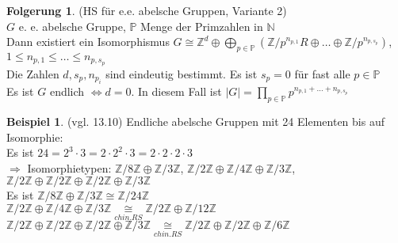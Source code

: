 \documentclass[10pt,a4paper,numbers=endperiod]{scrartcl}
\theoremstyle{definition}
\newtheorem{bsp}[satz]{Beispiel}
\newtheorem{folg}[satz]{Folgerung}
\def\NN{{\mathbb N}}
\def\ZZ{{\mathbb Z}}
\def\PP{{\mathbb P}}
\begin{document}
\begin{folg}
	(HS für e.e. abelsche Gruppen, Variante 2)\\
	$G$ e. e. abelsche Gruppe, $\PP$ Menge der Primzahlen in $\NN$\\
	Dann existiert ein Isomorphismus $G \cong \ZZ^d \oplus \bigoplus\limits_{p \in \PP} (\ZZ/p^{n_{p,1}}R \oplus \ldots \oplus \ZZ/p^{n_{p,s_p}})$, $1 \leq n_{p,1} \leq \ldots \leq n_{p,s_p}$\\
	Die Zahlen $d, s_p, n_{p_i}$ sind eindeutig bestimmt. Es ist $s_p = 0$ für fast alle $p \in \PP$\\
	Es ist $G$ endlich $\Leftrightarrow d = 0$. In diesem Fall ist $|G| = \prod\limits_{p \in \PP} p^{n_{p,1}+ \ldots+ n_{p,s_p}}$
\end{folg}

\begin{bsp}
	(vgl. 13.10) Endliche abelsche Gruppen mit 24 Elementen bis auf Isomorphie:\\
	Es ist $24 = 2^3 \cdot 3 = 2 \cdot 2^2 \cdot 3 = 2 \cdot 2 \cdot 2 \cdot 3$\\
	$\Rightarrow$ Isomorphietypen: $\ZZ/8\ZZ \oplus \ZZ/3\ZZ$, \hspace{1,5 mm} $\ZZ/2\ZZ \oplus \ZZ/4\ZZ \oplus \ZZ/3\ZZ$, \hspace{1,5 mm} $\ZZ/2\ZZ \oplus \ZZ/2\ZZ \oplus \ZZ/2\ZZ \oplus \ZZ/3\ZZ$\\
	Es ist $\ZZ/8\ZZ \oplus \ZZ/3\ZZ \cong \ZZ/24\ZZ$\\
	$\ZZ/2\ZZ \oplus \ZZ/4\ZZ \oplus \ZZ/3\ZZ \underset{chin. RS}{\cong} \ZZ/2\ZZ \oplus \ZZ/12\ZZ$\\
	$\ZZ/2\ZZ \oplus \ZZ/2\ZZ \oplus \ZZ/2\ZZ \oplus \ZZ/3\ZZ \underset{chin. RS}{\cong} \ZZ/2\ZZ \oplus \ZZ/2\ZZ \oplus \ZZ/6\ZZ$
\end{bsp}
\end{document}
